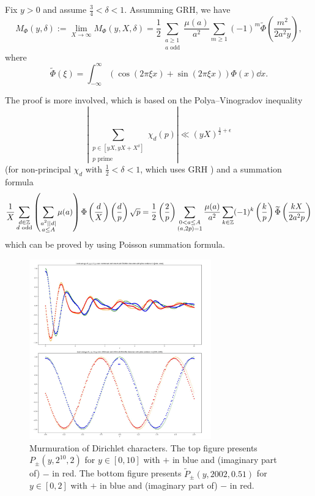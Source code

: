 \begin{theorem}
    Fix $y > 0$ and assume $\frac{3}{4} < \delta < 1$.
    Assumming GRH, we have
    \begin{equation}
        M_{\Phi} (y, \delta) := \lim_{X \to \infty} M_{\Phi}(y, X, \delta) = \frac{1}{2} \sum_{\substack{a \ge 1 \\ a \text{ odd}}} \frac{\mu(a)}{a^2} \sum_{m \ge 1} (-1)^{m} \widetilde{\Phi} \left(\frac{m^2}{2 a^2 y}\right),
    \end{equation}
    where
    \begin{equation}
        \widetilde{\Phi}(\xi) = \int_{-\infty}^{\infty} (\cos(2 \pi \xi x) + \sin(2 \pi \xi x)) \Phi(x) \dd x.
    \end{equation}
\end{theorem}
The proof is more involved, which is based on the Polya--Vinogradov inequality 
\[
\left|\sum_{\substack{p \in [yX, yX + X^\delta] \\ p\text{ prime}}} \chi_d(p)\right| \ll (yX)^{\frac{1}{2} + \epsilon}
\]
(for non-principal $\chi_d$ with $\frac{1}{2} < \delta < 1$, which uses GRH \cite{granville2007large})
and a summation formula
\[
\frac{1}{X} \sum_{\substack{d \in \mathbb{Z} \\ d \text{ odd}}} \left(\sum_{\substack{a^2 | |d| \\ a \le A}} \mu(a)\right) \Phi\left(\frac{d}{X}\right) \left(\frac{d}{p}\right) \sqrt{p} = \frac{1}{2} \left(\frac{2}{p}\right) \sum_{\substack{0 < a \le A \\ (a, 2p) = 1}} \frac{\mu(a)}{a^2} \sum_{k \in \mathbb{Z}} (-1)^k \left(\frac{k}{p}\right) \widetilde{\Phi} \left(\frac{k X}{2 a^2 p}\right)
\]
which can be proved by using Poisson summation formula.


\begin{figure}[htp] 
\centering
    \includegraphics[width=0.7\textwidth]{src/lop.png}%
    \caption{Murmuration of Dirichlet characters. The top figure presents $P_{\pm}(y, 2^{10}, 2)$ for $y \in [0, 10]$ with $+$ in blue and (imaginary part of) $-$ in red. The bottom figure presents $\widetilde{P}_{\pm}(y, 2002, 0.51)$ for $y \in [0, 2]$ with $+$ in blue and (imaginary part of) $-$ in red.}
\label{fig:lop}
\end{figure}